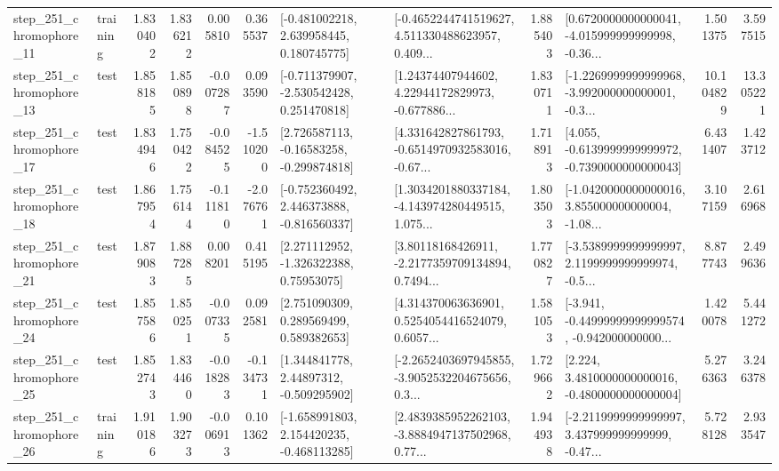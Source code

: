 \begin{tabular}{llrrrrllrlrr}
  step\_251\_chromophore\_11 &  training &      1.830402 &    1.836212 &      0.005810 &  0.365537 &    [-0.481002218, 2.639958445, 0.180745775] &  [-0.4652244741519627, 4.511330488623957, 0.409... &       1.885403 &  [0.6720000000000041, -4.015999999999998, -0.36... &            1.501375 &          3.597515 \\
  step\_251\_chromophore\_13 &      test &      1.858185 &    1.850898 &     -0.007287 &  0.093590 &   [-0.711379907, -2.530542428, 0.251470818] &  [1.24374407944602, 4.22944172829973, -0.677886... &       1.830711 &  [-1.2269999999999968, -3.992000000000001, -0.3... &           10.104829 &         13.305221 \\
  step\_251\_chromophore\_17 &      test &      1.834946 &    1.750422 &     -0.084525 & -1.510200 &    [2.726587113, -0.16583258, -0.299874818] &  [4.331642827861793, -0.6514970932583016, -0.67... &       1.718913 &  [4.055, -0.6139999999999972, -0.7390000000000043] &            6.431407 &          1.423712 \\
  step\_251\_chromophore\_18 &      test &      1.867954 &    1.756144 &     -0.111810 & -2.076761 &   [-0.752360492, 2.446373888, -0.816560337] &  [1.3034201880337184, -4.143974280449515, 1.075... &       1.803503 &  [-1.0420000000000016, 3.855000000000004, -1.08... &            3.107159 &          2.616968 \\
  step\_251\_chromophore\_21 &      test &      1.879083 &    1.887285 &      0.008201 &  0.415195 &     [2.271112952, -1.326322388, 0.75953075] &  [3.80118168426911, -2.2177359709134894, 0.7494... &       1.770827 &  [-3.5389999999999997, 2.1199999999999974, -0.5... &            8.877743 &          2.499636 \\
  step\_251\_chromophore\_24 &      test &      1.857586 &    1.850251 &     -0.007335 &  0.092581 &     [2.751090309, 0.289569499, 0.589382653] &  [4.314370063636901, 0.5254054416524079, 0.6057... &       1.581053 &  [-3.941, -0.44999999999999574, -0.942000000000... &            1.420078 &          5.441272 \\
  step\_251\_chromophore\_25 &      test &      1.852743 &    1.834460 &     -0.018283 & -0.134731 &     [1.344841778, 2.44897312, -0.509295902] &  [-2.2652403697945855, -3.9052532204675656, 0.3... &       1.729662 &   [2.224, 3.4810000000000016, -0.4800000000000004] &            5.276363 &          3.246378 \\
  step\_251\_chromophore\_26 &  training &      1.910186 &    1.903273 &     -0.006913 &  0.101362 &   [-1.658991803, 2.154420235, -0.468113285] &  [2.4839385952262103, -3.8884947137502968, 0.77... &       1.944938 &  [-2.2119999999999997, 3.437999999999999, -0.47... &            5.728128 &          2.933547 \\

\end{tabular}
